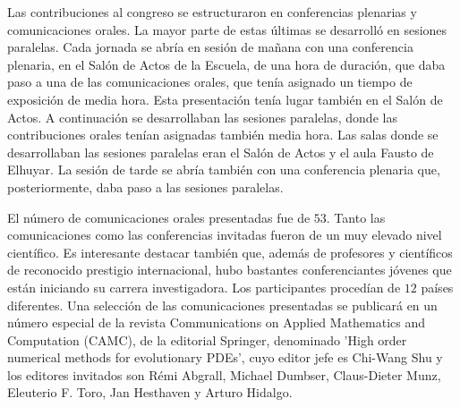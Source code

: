 \documentclass[twoside]{article}
\begin{document}
Las contribuciones al congreso se estructuraron en conferencias plenarias y comunicaciones orales. La mayor parte de estas últimas se desarrolló en sesiones paralelas. Cada jornada se abría en sesión de mañana con una conferencia plenaria, en el Salón de Actos de la Escuela, de una hora de duración, que daba paso a una de las comunicaciones orales, que tenía asignado un tiempo de exposición de media hora. Esta presentación tenía lugar también en el Salón de Actos. A continuación se desarrollaban las sesiones paralelas, donde las contribuciones orales tenían asignadas también media hora. Las salas donde se desarrollaban las sesiones paralelas eran el Salón de Actos y el aula Fausto de Elhuyar. La sesión de tarde se abría también con una conferencia plenaria que, posteriormente, daba paso a las sesiones paralelas.

El número de comunicaciones orales presentadas fue de $53$. Tanto las comunicaciones como las conferencias invitadas fueron de un muy elevado nivel científico. Es interesante destacar también que, además de profesores y científicos de reconocido prestigio internacional, hubo bastantes conferenciantes jóvenes que están iniciando su carrera investigadora. Los participantes procedían de $12$ países diferentes. Una selección de las comunicaciones presentadas se publicará en un número especial de la revista Communications on Applied Mathematics and Computation (CAMC), de la editorial Springer, denominado 'High order numerical methods for evolutionary PDEs', cuyo editor jefe es Chi-Wang Shu y los editores invitados son Rémi Abgrall, Michael Dumbser, Claus-Dieter Munz, Eleuterio F. Toro, Jan Hesthaven y Arturo Hidalgo.
\end{document}
